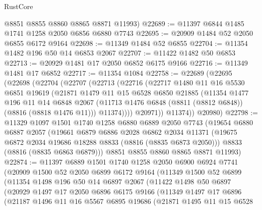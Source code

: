 \begin{lexlean}{RustCore}
\begin{coremodule}
      @8851
      @8855
      @8860
      @8865
      @8871
      @11993)
@22689 := @11397 @6844 @1485 @1741 @1258 @2050 @6856 @6880 @7743
@22695 := @20909 @1484 @52 @2050 @6855 @6172 @9164
@22698 := @11349 @1484 @52 @6855
@22704 := @11354 @1482 @196 @50 @14 @6853 @2067
@22707 := @11422 @1482 @50 @6853
@22713 := @20929 @1481 @17 @2050 @6852 @6175 @9166
@22716 := @11349 @1481 @17 @6852
@22717 := @11354 @1084
@22758 := @22689
    (@22695
      (@22698
        (@22704
          (@22707
            (@22713
              (@22716
                (@22717
                  @1480
                  @11
                  @16
                  @5530
                  @6851
                  @19619
                  (@21871
                    @1479
                    @11
                    @15
                    @6528
                    @6850
                    @21885
                    (@11354
                      @1477
                      @196
                      @11
                      @14
                      @6848
                      @2067
                      (@11713 @1476 @6848 (@8811 (@8812 @6848)) (@8816 (@8818 @1476 @11)))
                      @11374))))
              @20971))
          @11374))
      @20980)
@22798 := @11329
    @1097
    @1501
    @1740
    @1258
    @6880
    @6889
    @2050
    @7743
    (@19654
      @6880
      @6887
      @2057
      (@19661
        @6879
        @6886
        @2028
        @6862
        @2034
        @11371
        (@19675 @6872 @2034 @19686 @18288 @8833 (@8816 (@8835 @6873 @2050)))
        @8833
        (@8816 (@8835 @6863 @6879)))
      @8851
      @8855
      @8860
      @8865
      @8871
      @11993)
@22874 := @11397
    @6889
    @1501
    @1740
    @1258
    @2050
    @6900
    @6924
    @7741
    (@20909
      @1500
      @52
      @2050
      @6899
      @6172
      @9164
      (@11349
        @1500
        @52
        @6899
        (@11354
          @1498
          @196
          @50
          @14
          @6897
          @2067
          (@11422
            @1498
            @50
            @6897
            (@20929
              @1497
              @17
              @2050
              @6896
              @6175
              @9166
              (@11349
                @1497
                @17
                @6896
                (@21187
                  @1496
                  @11
                  @16
                  @5567
                  @6895
                  @19686
                  (@21871
                    @1495
                    @11
                    @15
                    @6528

\end{coremodule}
\end{lexlean}
